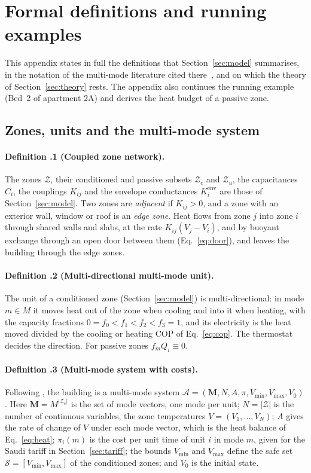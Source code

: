 \documentclass[10pt,a4paper,twocolumn]{article}
\theoremstyle{definition}
\begin{document}
\section{Formal definitions and running examples}\label{S:formal}\label{app:S4}
This appendix states in full the definitions that Section~\ref{sec:model} summarises, in the notation of the multi-mode literature cited there~\citep{alur2013safe,mousa2016optimal}, and on which the theory of Section~\ref{sec:theory} rests. The appendix also continues the running example (Bed~2 of apartment 2A) and derives the heat budget of a passive zone.

\subsection{Zones, units and the multi-mode system}
\paragraph{Definition \thesection.1 (Coupled zone network).} The zones $\mathcal{Z}$, their conditioned and passive subsets $\mathcal{Z}_c$ and $\mathcal{Z}_u$, the capacitances $C_i$, the couplings $K_{ij}$ and the envelope conductances $K^{\mathrm{env}}_i$ are those of Section~\ref{sec:model}. Two zones are \emph{adjacent} if $K_{ij}>0$, and a zone with an exterior wall, window or roof is an \emph{edge zone}. Heat flows from zone $j$ into zone $i$ through shared walls and slabs, at the rate $K_{ij}(V_j-V_i)$, and by buoyant exchange through an open door between them (Eq.~\eqref{eq:door}), and leaves the building through the edge zones.

\paragraph{Definition \thesection.2 (Multi-directional multi-mode unit).} The unit of a conditioned zone (Section~\ref{sec:model}) is multi-directional: in mode $m\in M$ it moves heat out of the zone when cooling and into it when heating, with the capacity fractions $0=f_0<f_1<f_2<f_3=1$, and its electricity is the heat moved divided by the cooling or heating COP of Eq.~\eqref{eq:cop}. The thermostat decides the direction. For passive zones $f_mQ_i\equiv0$.

\paragraph{Definition \thesection.3 (Multi-mode system with costs).} Following \citet{mousa2017optimal}, the building is a multi-mode system $\mathcal{A}=(\mathbf{M},N,A,\pi,V_{\min},V_{\max},V_0)$. Here $\mathbf{M}=M^{|\mathcal{Z}_c|}$ is the set of mode vectors, one mode per unit; $N=|\mathcal{Z}|$ is the number of continuous variables, the zone temperatures $V=(V_1,\dots,V_N)$; $A$ gives the rate of change of $V$ under each mode vector, which is the heat balance of Eq.~\eqref{eq:heat}; $\pi_i(m)$ is the cost per unit time of unit $i$ in mode $m$, given for the Saudi tariff in Section~\ref{sec:tariff}; the bounds $V_{\min}$ and $V_{\max}$ define the safe set $\mathcal{S}=[V_{\min},V_{\max}]$ of the conditioned zones; and $V_0$ is the initial state.
\end{document}
